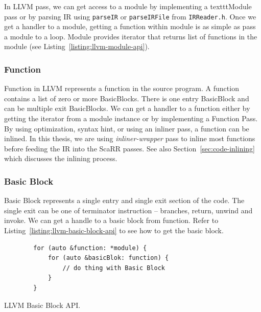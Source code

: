 In LLVM pass, we can get access to a module by implementing a texttt{Module}
pass or by parsing IR using \texttt{parseIR} or \texttt{parseIRFile} from
\texttt{IRReader.h}. Once we get a handler to a module, getting a function
within module is as simple as pass a module to a loop.  Module provides iterator
that returns list of functions in the module (see
Listing~\ref{listing:llvm-module-api}).


\subsubsection{Function}

Function in LLVM represents a function in the source program. A function
contains a list of zero or more BasicBlocks. There is one entry BasicBlock and
can be multiple exit BasicBlocks. We can get a handler to a function either by
getting the iterator from a module instance or by implementing a Function Pass.
By using optimization, syntax hint, or using an inliner pass, a function can be
inlined. In this thesis, we are using \emph{inliner-wrapper} pass to inline most
functions before feeding the IR into the ScaRR passes. See also
Section~\ref{sec:code-inlining} which discusses the inlining process.

\subsubsection{Basic Block}

Basic Block represents a single entry and single exit section of the code. The
single exit can be one of terminator instruction -- branches, return, unwind and
invoke. We can get a handle to a basic block from function. Refer to
Listing~\ref{listing:llvm-basic-block-api} to see how to get the basic block.

\begin{listing}[htbp]
    \begin{verbatim}
        for (auto &function: *module) {
            for (auto &basicBlok: function) {
                // do thing with Basic Block
            }
        }
    \end{verbatim}
    \caption{LLVM Basic Block API.}    
    \label{listing:llvm-basic-block-api}
\end{listing}

